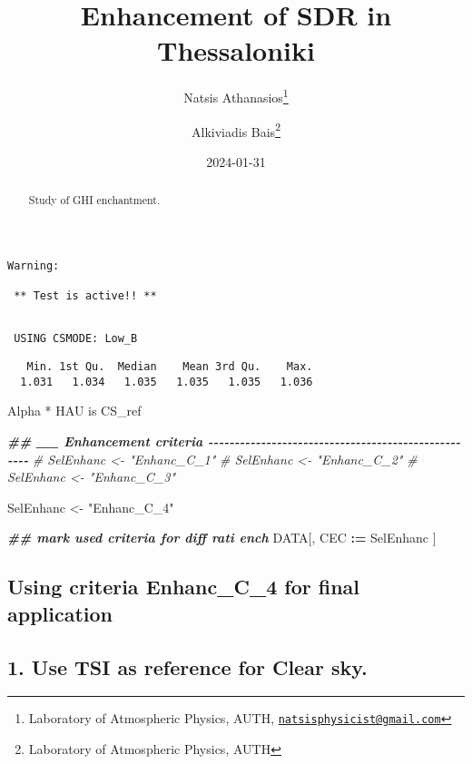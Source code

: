 \documentclass[
  10pt,
  a4paper,oneside]{article}
\title{Enhancement of SDR in Thessaloniki}
\author{Natsis Athanasios\footnote{Laboratory of Atmospheric Physics, AUTH, \href{mailto:natsisphysicist@gmail.com}{\nolinkurl{natsisphysicist@gmail.com}}} \and Alkiviadis Bais\footnote{Laboratory of Atmospheric Physics, AUTH}}
\date{2024-01-31}
\newenvironment{Shaded}{\begin{snugshade}}{\end{snugshade}}
\newcommand{\CommentTok}[1]{\textcolor[rgb]{0.56,0.35,0.01}{\textit{#1}}}
\newcommand{\DocumentationTok}[1]{\textcolor[rgb]{0.56,0.35,0.01}{\textbf{\textit{#1}}}}
\newcommand{\NormalTok}[1]{#1}
\newcommand{\OtherTok}[1]{\textcolor[rgb]{0.56,0.35,0.01}{#1}}
\newcommand{\SpecialCharTok}[1]{\textcolor[rgb]{0.81,0.36,0.00}{\textbf{#1}}}
\newcommand{\StringTok}[1]{\textcolor[rgb]{0.31,0.60,0.02}{#1}}
\begin{document}
\maketitle
\begin{abstract}
Study of GHI enchantment.
\end{abstract}

{
\hypersetup{linkcolor=}
\setcounter{tocdepth}{4}
\tableofcontents
}
\begin{verbatim}
Warning: 

 ** Test is active!! ** 
\end{verbatim}

\begin{verbatim}

 USING CSMODE: Low_B 
\end{verbatim}

\begin{verbatim}
   Min. 1st Qu.  Median    Mean 3rd Qu.    Max. 
  1.031   1.034   1.035   1.035   1.035   1.036 
\end{verbatim}

Alpha * HAU is CS\_ref

\begin{Shaded}
\begin{Highlighting}[]
\DocumentationTok{\#\# \_\_ Enhancement criteria  {-}{-}{-}{-}{-}{-}{-}{-}{-}{-}{-}{-}{-}{-}{-}{-}{-}{-}{-}{-}{-}{-}{-}{-}{-}{-}{-}{-}{-}{-}{-}{-}{-}{-}{-}{-}{-}{-}{-}{-}{-}{-}{-}{-}{-}{-}{-}{-}{-}{-}{-}{-}}
\CommentTok{\# SelEnhanc \textless{}{-} "Enhanc\_C\_1"}
\CommentTok{\# SelEnhanc \textless{}{-} "Enhanc\_C\_2"}
\CommentTok{\# SelEnhanc \textless{}{-} "Enhanc\_C\_3"}

\NormalTok{SelEnhanc }\OtherTok{\textless{}{-}} \StringTok{"Enhanc\_C\_4"}


\DocumentationTok{\#\# mark used criteria for diff rati ench}
\NormalTok{DATA[, CEC }\SpecialCharTok{:=}\NormalTok{ SelEnhanc ]}
\end{Highlighting}
\end{Shaded}

\hypertarget{using-criteria-enhanc_c_4-for-final-application}{%
\subsection{\texorpdfstring{Using criteria \textbf{Enhanc\_C\_4} for final application}{Using criteria Enhanc\_C\_4 for final application}}\label{using-criteria-enhanc_c_4-for-final-application}}

\hypertarget{use-tsi-as-reference-for-clear-sky.}{%
\subsection{1. Use TSI as reference for Clear sky.}\label{use-tsi-as-reference-for-clear-sky.}}
\end{document}
